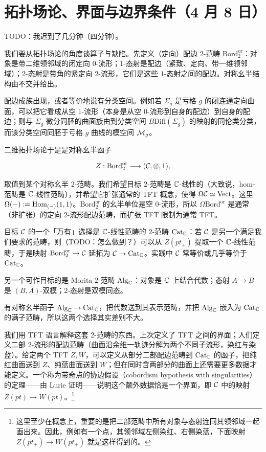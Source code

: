 \section[拓扑场论、界面与边界条件]{拓扑场论、界面与边界条件（4 月 8 日）}


TODO：我迟到了几分钟（四分钟）。

我们要从拓扑场论的角度谈算子与缺陷。先定义（定向）配边 $2$-范畴 $\mathrm{Bord}_2^{\mathrm{or}}$：对象是带二维领邻域的闭定向 $0$-流形；$1$-态射是配边（紧致、定向、带一维领邻域）；$2$-态射是带角的紧定向 $2$-流形，它们是这些 $1$-态射之间的配边。对称幺半结构由不交并给出。

配边成族出现，或者等价地说有分类空间。例如若 $\Sigma_g$ 是亏格 $g$ 的闭连通定向曲面，可以把它看成从空 $1$-流形（本身是从空 $0$-流形到自身的配边）到自身的配边；则与 $\Sigma_g$ 微分同胚的曲面族由到分类空间 $B\mathrm{Diff}(\Sigma_g)$ 的映射的同伦类分类，而该分类空间同胚于亏格 $g$ 曲线的模空间 $\mathcal{M}_g$。

二维拓扑场论于是是对称幺半函子

\[Z:\mathrm{Bord}_2^{\mathrm{or}}\longrightarrow(\mathcal{C},\otimes,1),\]

取值到某个对称幺半 $2$-范畴。我们希望目标 $2$-范畴是 $\mathbb{C}$-线性的（大致说，hom-范畴是 $\mathbb{C}$-线性范畴），并希望它扩张通常的 TFT 概念，使得 $\Omega\mathcal{C}\simeq\mathrm{Vect}$。这里 $\Omega(-):=\operatorname{Hom}_{(-)}(1,1)$。$\mathrm{Bord}_2^{\mathrm{or}}$ 的幺半单位是空 $0$-流形，所以 $\Omega\mathrm{Bord}^{\mathrm{or}}$ 是通常（非扩张）的定向 $2$-流形配边范畴，而扩张 TFT 限制为通常 TFT。

目标 $\mathcal{C}$ 的一个「万有」选择是 $\mathbb{C}$-线性范畴的 $2$-范畴 $\mathrm{Cat}_{\mathbb{C}}$：若 $\mathcal{C}$ 是另一个满足我们要求的范畴，则（TODO：怎么做到？）可以从 $Z(pt_+)$ 提取一个 $\mathbb{C}$-线性范畴，于是映射 $\mathrm{Bord}_2^{\mathrm{or}}\to\mathcal{C}$ 延拓为 $\mathcal{C}\to\mathrm{Cat}_{\mathbb{C}}$。实践中 $\mathcal{C}$ 常等价或几乎等价于 $\mathrm{Cat}_{\mathbb{C}}$。

\begin{example}
另一个可作目标的是 Morita $2$-范畴 $\mathrm{Alg}_{\mathbb{C}}$：对象是 $\mathbb{C}$ 上结合代数；态射 $A\to B$ 是 $(B,A)$-双模；$2$-态射是双模同态。
\end{example}

有对称幺半函子 $\mathrm{Alg}_{\mathbb{C}}\to\mathrm{Cat}_{\mathbb{C}}$，把代数送到其表示范畴，并把 $\mathrm{Alg}_{\mathbb{C}}$ 嵌入为 $\mathrm{Cat}_{\mathbb{C}}$ 的满子范畴，所以这两个选择其实差别不大。

我们用 TFT 语言解释这套 $2$-范畴的东西。上次定义了 TFT 之间的界面；人们定义二部 $2$-流形的配边范畴（曲面沿余维一轨迹分解为两个不同子流形，染红与染蓝）。给定两个 TFT $Z,W$，可以定义从部分二部配边范畴到 $\mathrm{Cat}_{\mathbb{C}}$ 的函子，把纯红曲面送到 $Z$、纯蓝曲面送到 $W$；但在同时含两部分的曲面上还需要更多数据才能定义。一个称为带奇点的协边假设（cobordism hypothesis with singularities）的定理——由 Lurie 证明——说明这个额外数据恰是一个界面，即 $\mathcal{C}$ 中的映射 $Z(pt)\to W(pt)$。\footnote{这里至少在概念上，重要的是把二部范畴中所有对象与态射连同其领邻域一起画出来。因此，例如有一个点，其领邻域左侧染红、右侧染蓝，下面映射 $Z(pt_+)\to W(pt_+)$ 就是这样得到的。}

